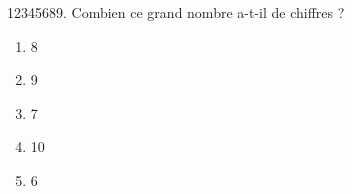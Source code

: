 12345689. Combien ce grand nombre a-t-il de chiffres ?
\begin{multicols}{2}
  \begin{enumerate}[A/]
  \item 8
  \item 9
  \item 7
  \item 10
  \item 6
  \end{enumerate}
  \end{multicols}
